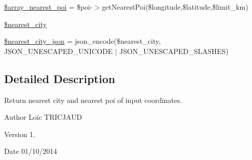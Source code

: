 \begin{DoxyCompactItemize}
\item 
\hyperlink{nearest_8php_a0919b64d32b8806e2d59272d197f32e7}{\$array\-\_\-nearest\-\_\-poi} = \$poi-\/$>$get\-Nearest\-Poi(\$longitude,\$latitude,\$limit\-\_\-km)
\item 
\hyperlink{nearest_8php_abf6b27fab4f9b20ea05f510f3b597d52}{\$nearest\-\_\-city}
\item 
\hyperlink{nearest_8php_a0b142ae8ff992c1fff670c905b46e066}{\$nearest\-\_\-city\-\_\-json} = json\-\_\-encode(\$nearest\-\_\-city, J\-S\-O\-N\-\_\-\-U\-N\-E\-S\-C\-A\-P\-E\-D\-\_\-\-U\-N\-I\-C\-O\-D\-E $\vert$ J\-S\-O\-N\-\_\-\-U\-N\-E\-S\-C\-A\-P\-E\-D\-\_\-\-S\-L\-A\-S\-H\-E\-S)
\end{DoxyCompactItemize}


\subsection{Detailed Description}
Return nearest city and nearest poi of input coordinates. \begin{DoxyAuthor}{Author}
Loïc T\-R\-I\-C\-J\-A\-U\-D 
\end{DoxyAuthor}
\begin{DoxyVersion}{Version}
1. 
\end{DoxyVersion}
\begin{DoxyDate}{Date}
01/10/2014 
\end{DoxyDate}


